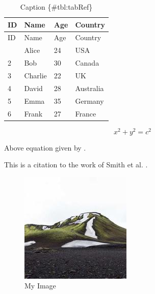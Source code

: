 \documentclass[
  12pt,
  a4paper,
  ]{report}
\begin{document}
\begin{center}
\label{GraphRef}
\end{center}

\begin{longtable}[]{@{}llll@{}}
\caption{Caption \{\#tbl:tabRef\}}\tabularnewline
\toprule\noalign{}
ID & Name & Age & Country \\
\midrule\noalign{}
\endfirsthead
\toprule\noalign{}
ID & Name & Age & Country \\
\midrule\noalign{}
\endhead
\bottomrule\noalign{}
\endlastfoot
1 & Alice & 24 & USA \\
2 & Bob & 30 & Canada \\
3 & Charlie & 22 & UK \\
4 & David & 28 & Australia \\
5 & Emma & 35 & Germany \\
6 & Frank & 27 & France \\
\end{longtable}

\[ x^2 + y^2 = c^2 \]

Above equation given by \autocite{Einstein1905}.

This is a citation to the work of Smith et al. \autocite{smith2021}.

\begin{figure}
\centering
\includegraphics{./resources/img.jpg}
\caption{My Image}\label{fig:imgRef}
\end{figure}
\printbibliography
\end{document}
